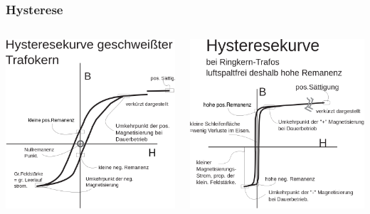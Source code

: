 \begin{frame}
  \frametitle{Hysterese}
  \begin{columns}[c]
    \begin{center}
      \includegraphics[width=1\textwidth,height=.8\textheight,keepaspectratio]{a08/Soft_hysteresis_welded.png}\\
      {\tiny \hyperlink{refs}{\cite{wm}}}
    \end{center}
    \begin{center}
      \includegraphics[width=1\textwidth,height=.8\textheight,keepaspectratio]{a08/Hard_hysteresis_de.png}\\
      {\tiny \hyperlink{refs}{\cite{wm}}}
    \end{center}
  \end{columns}
\end{frame}

